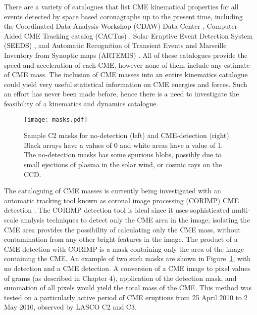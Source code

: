 There are a variety of catalogues that list CME kinematical properties for all events detected by space based coronagraphs up to the present time, including the Coordinated Data Analysis Workshop (CDAW) Data Center \citep{gopal2009b}, Computer Aided CME Tracking catalog (CACTus) \citep{robb2004}, Solar Eruptive Event Detection System (SEEDS) \citep{olmedo2008}, and  Automatic Recognition of Transient Events and Marseille Inventory from Synoptic maps (ARTEMIS) \citep{boursier2009}. All of these catalogues provide the speed and acceleration of each CME, however none of them include any estimate of CME mass. The inclusion of CME masses into an entire kinematics catalogue could yield very useful statistical information on CME energies and forces. Such an effort has never been made before, hence there is a need to investigate the feasibility of a kinematics and dynamics catalogue.
\begin{figure}[t!]
\begin{center}
\texttt{[image: masks.pdf]}
\caption[CORIMP masks]{Sample C2 masks for no-detection (left) and CME-detection (right). Black arrays have a values of 0 and white areas have a value of 1. The no-detection masks has some spurious blobs, possibly due to small ejections of plasma in the solar wind, or cosmic rays on the CCD.}
\label{fig:masks}
\end{center}
\end{figure}

The cataloguing of CME masses is currently being investigated with an automatic tracking tool known as coronal image processing (CORIMP) CME detection \citep{byrne2012}. The CORIMP detection tool is ideal since it uses sophisticated multi-scale analysis techniques to detect only the CME area in the image; isolating the CME area provides the possibility of calculating only the CME mass, without contamination from any other bright features in the image. The product of a CME detection with CORIMP is a mask containing only the area of the image containing the CME. An example of two such masks are shown in Figure~\ref{fig:masks}, with no detection and a CME detection. A conversion of a CME image to pixel values of grams (as described in Chapter 4), application of the detection mask, and summation of all pixels would yield the total mass of the CME. This method was tested on a particularly active period of CME eruptions from 25 April 2010 to 2 May 2010, observed by LASCO C2 and C3. 

